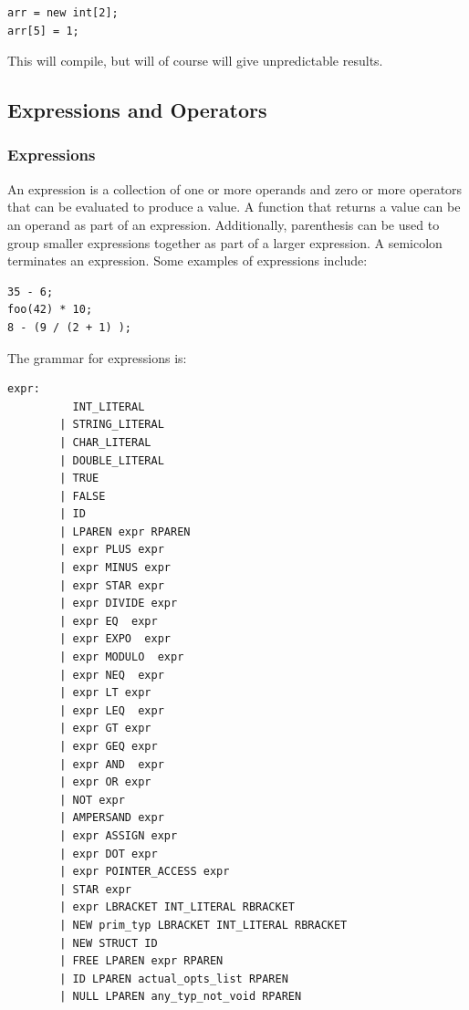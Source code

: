 \documentclass{article}
\begin{document}
 \begin{lstlisting}
arr = new int[2];
arr[5] = 1;
\end{lstlisting}
This will compile, but will of course will give unpredictable results. 

\subsection{Expressions and Operators}

\subsubsection{Expressions}
An expression is a collection of one or more operands and zero or more operators that can be evaluated to produce a value.  A function that returns a value can be an operand as part of an expression.  Additionally, parenthesis can be used to group smaller expressions together as part of a larger expression.  A semicolon terminates an expression.  Some examples of expressions include:
\begin{lstlisting}
35 - 6;
foo(42) * 10;
8 - (9 / (2 + 1) );
\end{lstlisting}

The grammar for expressions is: 
\begin{Verbatim}[frame=single]
expr:
          INT_LITERAL           
        | STRING_LITERAL        
        | CHAR_LITERAL          
        | DOUBLE_LITERAL        
        | TRUE                  
        | FALSE              
        | ID                  
        | LPAREN expr RPAREN  
        | expr PLUS expr    
        | expr MINUS expr      
        | expr STAR expr    
        | expr DIVIDE expr      
        | expr EQ  expr         
        | expr EXPO  expr       
        | expr MODULO  expr     
        | expr NEQ  expr       
        | expr LT expr          
        | expr LEQ  expr        
        | expr GT expr        
        | expr GEQ expr     
        | expr AND  expr  
        | expr OR expr        
        | NOT expr            
        | AMPERSAND expr        
        | expr ASSIGN expr      
        | expr DOT expr         
        | expr POINTER_ACCESS expr      
        | STAR expr                     
        | expr LBRACKET INT_LITERAL RBRACKET         
        | NEW prim_typ LBRACKET INT_LITERAL RBRACKET
        | NEW STRUCT ID                              
        | FREE LPAREN expr RPAREN                   
        | ID LPAREN actual_opts_list RPAREN          
        | NULL LPAREN any_typ_not_void RPAREN       
\end{Verbatim}
\end{document}
